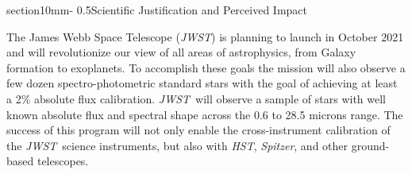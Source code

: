 \documentclass[letterpaper,12pt]{article}
\makeatletter
\renewcommand{\section}{\@startsection%
{section}{1}{0mm}{-\baselineskip}%
{0.5\baselineskip}{\normalfont\Large\bfseries}}%
\newcommand{\jwst}{{\it JWST}}
\newcommand{\spitzer}{{\it Spitzer}}
\newcommand{\hst}{{\it HST}}
\newcommand{\swift}{{\it Swift}}
\newcommand{\fermi}{{\it Fermi}}
\makeatother
\begin{document}




\section{Scientific Justification and Perceived Impact}

The James Webb Space Telescope (\jwst) is planning to launch in October 2021 and will revolutionize our view of all areas of astrophysics, from Galaxy formation to exoplanets. To accomplish these goals the mission will also observe a few dozen spectro-photometric standard stars with the goal of achieving at least a 2\% absolute flux calibration. \jwst\ will observe a sample of stars with well known absolute flux and spectral shape across the 0.6 to 28.5 microns range. The success of this program will not only enable the cross-instrument calibration of the \jwst\ science instruments, but also with \hst, \spitzer, and other ground-based telescopes.
\end{document}
